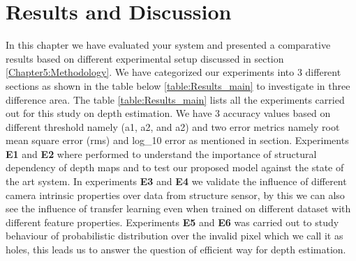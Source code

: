

\chapter{Results and Discussion}

\label{Chapter6:Results}

 
 
In this chapter we have evaluated your system and presented a comparative results  based on different experimental setup discussed in section \ref{Chapter5:Methodology}. We have categorized our experiments into 3 different sections as shown in the table below \ref{table:Results_main} to investigate in three difference area. The table \ref{table:Results_main} lists all the experiments carried out for this study on depth estimation. We have 3 accuracy values based on different threshold namely (a1, a2, and a2) and two error metrics namely root mean square error (rms) and log\_10 error as mentioned in section. Experiments \textbf{E1} and \textbf{E2} where performed to understand the importance of structural dependency of depth maps and to test our proposed model against the state of the art system. In experiments \textbf{E3} and \textbf{E4} we validate the influence of different camera intrinsic properties over data from structure sensor, by this we can also see the influence of transfer learning even when trained on different dataset with different feature properties. Experiments \textbf{E5} and \textbf{E6} was carried out to study behaviour of probabilistic distribution over the invalid pixel which we call it as holes, this leads us to answer the question of efficient way for depth estimation.
 

